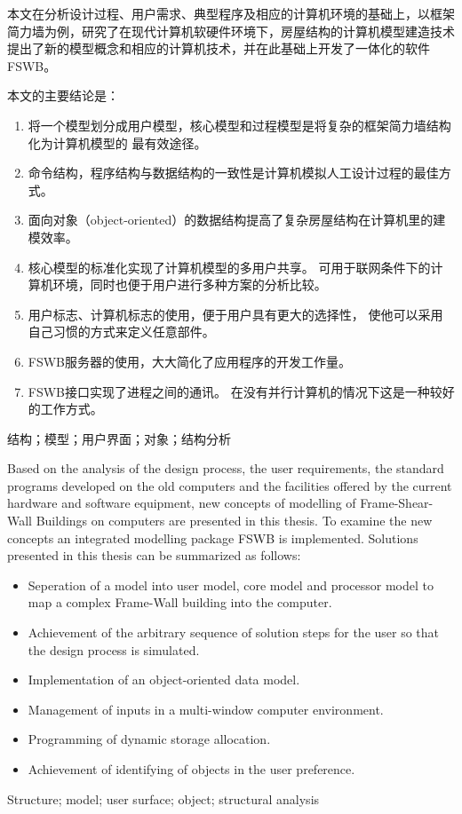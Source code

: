 \begin{cnabstract}
本文在分析设计过程、用户需求、典型程序及相应的计算机环境的基础上，以框架简力墙为例，研究了在现代计算机软硬件环境下，房屋结构的计算机模型建造技术提出了新的模型概念和相应的计算机技术，并在此基础上开发了一体化的软件FSWB。

本文的主要结论是：
\begin{enumerate}
\item 将一个模型划分成用户模型，核心模型和过程模型是将复杂的框架简力墙结构化为计算机模型的%
  最有效途径。
\item 命令结构，程序结构与数据结构的一致性是计算机模拟人工设计过程的最佳方式。
\item 面向对象（object-oriented）的数据结构提高了复杂房屋结构在计算机里的建模效率。
\item 核心模型的标准化实现了计算机模型的多用户共享。%
  可用于联网条件下的计算机环境，同时也便于用户进行多种方案的分析比较。
\item 用户标志、计算机标志的使用，便于用户具有更大的选择性，%
  使他可以采用自己习惯的方式来定义任意部件。
\item FSWB服务器的使用，大大简化了应用程序的开发工作量。
\item FSWB接口实现了进程之间的通讯。%
  在没有并行计算机的情况下这是一种较好的工作方式。
\end{enumerate}
\end{cnabstract}
\begin{cnkeywords}
结构；模型；用户界面；对象；结构分析
\end{cnkeywords}
\begin{enabstract}
Based on the analysis of the design process, the user requirements, %
the standard programs developed on the old computers and%
the facilities offered by the current hardware and software equipment, %
new concepts of modelling of Frame-Shear-Wall Buildings on computers are presented in %
this thesis. %
To examine the new concepts an integrated modelling package FSWB is implemented. %
Solutions presented in this thesis can be summarized as follows:

\begin{itemize}
\item Seperation of a model into user model, core model and processor model to map%
  a complex Frame-Wall building into the computer.
\item Achievement of the arbitrary sequence of solution steps for the user so that%
  the design process is simulated.
\item Implementation of an object-oriented data model.
\item Management of inputs in a multi-window computer environment.
\item Programming of dynamic storage allocation.
\item Achievement of identifying of objects in the user preference.
\end{itemize}
\end{enabstract}
\begin{enkeywords}
Structure; model; user surface; object; structural analysis
\end{enkeywords}
\makeabstract
\tableofcontents

